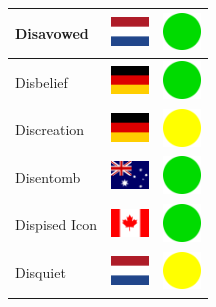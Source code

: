 \documentclass[12pt, a4paper, twoside]{report}
\begin{document}
\begin{center}
\begin{longtable}{|p{5cm}|p{2cm}|p{2cm}|}
 Disavowed                                                  & \includegraphics[width=1cm]{../4x3/nl} &   \includegraphics[width=1cm]{../likes/y} \\ \hline
 Disbelief                                                  & \includegraphics[width=1cm]{../4x3/de} &   \includegraphics[width=1cm]{../likes/y} \\ \hline
 Discreation                                                & \includegraphics[width=1cm]{../4x3/de} &   \includegraphics[width=1cm]{../likes/m} \\ \hline
 Disentomb                                                  & \includegraphics[width=1cm]{../4x3/au} &   \includegraphics[width=1cm]{../likes/y} \\ \hline
 Dispised Icon                                              & \includegraphics[width=1cm]{../4x3/ca} &   \includegraphics[width=1cm]{../likes/y} \\ \hline
 Disquiet                                                   & \includegraphics[width=1cm]{../4x3/nl} &   \includegraphics[width=1cm]{../likes/m} \\ \hline

\end{longtable}
\end{center}
\end{document}
